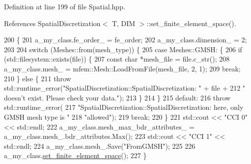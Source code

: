 Definition at line 199 of file Spatial.\+hpp.



References Spatial\+Discretization$<$ T, D\+I\+M $>$\+::set\+\_\+finite\+\_\+element\+\_\+space().


\begin{DoxyCode}
200                                                               \{
201     a\_my\_class.fe\_order\_ = fe\_order;
202     a\_my\_class.dimension\_ = 2;
203 
204     \textcolor{keywordflow}{switch} (Meshes::from(mesh\_type)) \{
205       \textcolor{keywordflow}{case} Meshes::GMSH: \{
206         \textcolor{keywordflow}{if} (std::filesystem::exists(file)) \{
207           \textcolor{keyword}{const} \textcolor{keywordtype}{char} *mesh\_file = file.c\_str();
208           a\_my\_class.mesh\_ = mfem::Mesh::LoadFromFile(mesh\_file, 2, 1);
209           \textcolor{keywordflow}{break};
210         \} \textcolor{keywordflow}{else} \{
211           \textcolor{keywordflow}{throw} std::runtime\_error(\textcolor{stringliteral}{"SpatialDiscretization::SpatialDiscretization: "} + file +
212                                    \textcolor{stringliteral}{" doesn't exist. Please check your data."});
213         \}
214       \}
215       \textcolor{keywordflow}{default}:
216         \textcolor{keywordflow}{throw} std::runtime\_error(
217             \textcolor{stringliteral}{"SpatialDiscretization::SpatialDiscretization: here, only GMSH mesh type is "}
218             \textcolor{stringliteral}{"allowed"});
219         \textcolor{keywordflow}{break};
220     \}
221     std::cout << \textcolor{stringliteral}{"CCI 0"} << std::endl;
222     a\_my\_class.mesh\_max\_bdr\_attributes\_ = a\_my\_class.mesh\_.bdr\_attributes.Max();
223     std::cout << \textcolor{stringliteral}{"CCI 1"} << std::endl;
224     a\_my\_class.mesh\_.Save(\textcolor{stringliteral}{"FromGMSH"});
225 
226     a\_my\_class.\hyperlink{classSpatialDiscretization_a8400a265a094312b4d57708d44f9d627}{set\_finite\_element\_space}();
227   \}
\end{DoxyCode}
\mbox{\label{structspecialized__spatial__constructor_3_01T_00_012_01_4_a042d171694bc56092b0473257797a730}} 
